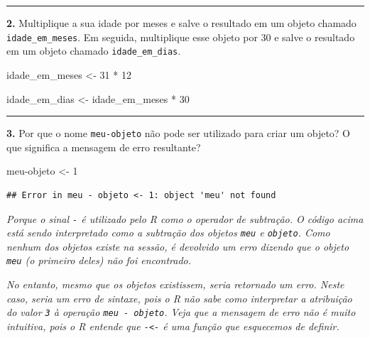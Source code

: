 \documentclass[
]{book}
\newenvironment{Shaded}{\begin{snugshade}}{\end{snugshade}}
\newcommand{\DecValTok}[1]{\textcolor[rgb]{0.00,0.00,0.81}{#1}}
\newcommand{\NormalTok}[1]{#1}
\newcommand{\OtherTok}[1]{\textcolor[rgb]{0.56,0.35,0.01}{#1}}
\newcommand{\SpecialCharTok}[1]{\textcolor[rgb]{0.00,0.00,0.00}{#1}}
\begin{document}
\begin{center}\rule{0.5\linewidth}{0.5pt}\end{center}

\textbf{2.} Multiplique a sua idade por meses e salve o resultado em um objeto chamado \texttt{idade\_em\_meses}. Em seguida, multiplique esse objeto por 30 e salve o resultado em um objeto chamado \texttt{idade\_em\_dias}.

\begin{Shaded}
\begin{Highlighting}[]
\NormalTok{idade\_em\_meses }\OtherTok{\textless{}{-}} \DecValTok{31} \SpecialCharTok{*} \DecValTok{12}

\NormalTok{idade\_em\_dias }\OtherTok{\textless{}{-}}\NormalTok{ idade\_em\_meses }\SpecialCharTok{*} \DecValTok{30}
\end{Highlighting}
\end{Shaded}

\begin{center}\rule{0.5\linewidth}{0.5pt}\end{center}

\textbf{3.} Por que o nome \texttt{meu-objeto} não pode ser utilizado para criar um objeto? O que significa a mensagem de erro resultante?

\begin{Shaded}
\begin{Highlighting}[]
\NormalTok{meu}\SpecialCharTok{{-}}\NormalTok{objeto }\OtherTok{\textless{}{-}} \DecValTok{1}
\end{Highlighting}
\end{Shaded}

\begin{verbatim}
## Error in meu - objeto <- 1: object 'meu' not found
\end{verbatim}

\emph{Porque o sinal \texttt{-} é utilizado pelo R como o operador de subtração. O código acima está sendo interpretado como a subtração dos objetos \texttt{meu} e \texttt{objeto}. Como nenhum dos objetos existe na sessão, é devolvido um erro dizendo que o objeto \texttt{meu} (o primeiro deles) não foi encontrado.}

\emph{No entanto, mesmo que os objetos existissem, seria retornado um erro. Neste caso, seria um erro de sintaxe, pois o R não sabe como interpretar a atribuição do valor \texttt{3} à operação \texttt{meu\ -\ objeto}. Veja que a mensagem de erro não é muito intuitiva, pois o R entende que \texttt{-\textless{}-} é uma função que esquecemos de definir.}
\end{document}
